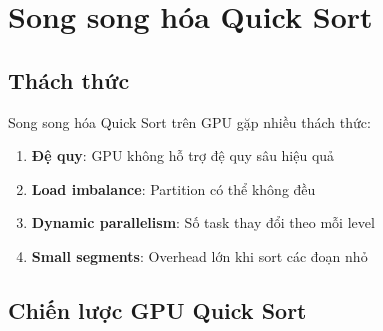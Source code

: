 \section{Song song hóa Quick Sort}

\subsection{Thách thức}

Song song hóa Quick Sort trên GPU gặp nhiều thách thức:

\begin{enumerate}
    \item \textbf{Đệ quy}: GPU không hỗ trợ đệ quy sâu hiệu quả
    \item \textbf{Load imbalance}: Partition có thể không đều
    \item \textbf{Dynamic parallelism}: Số task thay đổi theo mỗi level
    \item \textbf{Small segments}: Overhead lớn khi sort các đoạn nhỏ
\end{enumerate}

\subsection{Chiến lược GPU Quick Sort}

